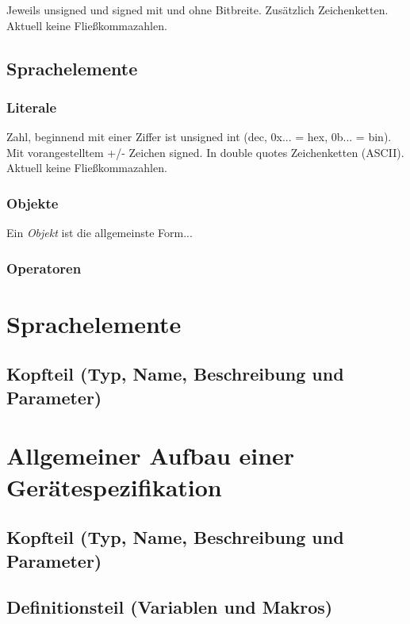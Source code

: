 \documentclass{scrartcl}
\begin{document}
\noindent Jeweils unsigned und signed mit und ohne Bitbreite. Zusätzlich Zeichenketten. Aktuell keine Fließkommazahlen.

\subsection{Sprachelemente}

\subsubsection{Literale}

\noindent Zahl, beginnend mit einer Ziffer ist unsigned int (dec, 0x... = hex, 0b... = bin). Mit vorangestelltem +/- Zeichen signed. In double quotes Zeichenketten (ASCII). Aktuell keine Fließkommazahlen.

\subsubsection{Objekte}

\noindent Ein \textit{Objekt} ist die allgemeinste Form...

\subsubsection{Operatoren}

\section{Sprachelemente}

\subsection{Kopfteil (Typ, Name, Beschreibung und Parameter)}

\section{Allgemeiner Aufbau einer Gerätespezifikation}

\subsection{Kopfteil (Typ, Name, Beschreibung und Parameter)}

\subsection{Definitionsteil (Variablen und Makros)}
\end{document}
